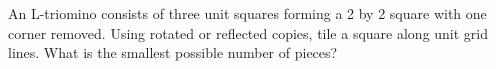 An L-triomino consists of three unit squares forming a 2 by 2 square with one corner removed. Using rotated or reflected copies, tile a square along unit grid lines. What is the smallest possible number of pieces?
